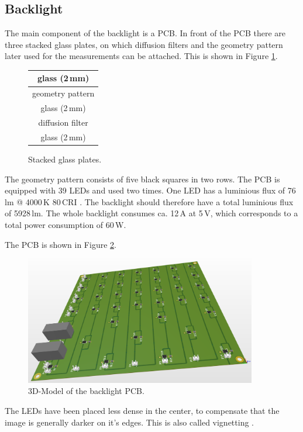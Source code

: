 \subsection{Backlight}
The main component of the backlight is a PCB.
In front of the PCB there are three stacked glass plates, on which diffusion filters and the geometry pattern later used for the measurements can be attached.
This is shown in Figure \ref{development:glass}.
\begin{figure}[ht]
	\centering
	\setlength{\tabcolsep}{12em}
	{\renewcommand{\arraystretch}{1}	
	\begin{tabular}{|c|}
		\hline
		\multicolumn{1}{|c|}{glass (2\,mm)}\\
		\hline
		\multicolumn{1}{|c|}{geometry pattern}\\
		\hline
		\multicolumn{1}{|c|}{glass (2\,mm)}\\
		\hline
		\multicolumn{1}{|c|}{diffusion filter}\\
		\hline
		\multicolumn{1}{|c|}{glass (2\,mm)}\\
		\hline
	\end{tabular}
	}
	\caption{Stacked glass plates.\label{development:glass}}
\end{figure}

The geometry pattern consists of five black squares in two rows.
The PCB is equipped with 39 LEDs and used two times.
One LED has a luminious flux of 76\,lm @ 4000\,K 80\,CRI \cite{led}.
The backlight should therefore have a total luminious flux of 5928\,lm.
The whole backlight consumes ca. 12\,A at 5\,V, which corresponds to a total power consumption of 60\,W. 

The PCB is shown in Figure \ref{development:pcb}.
\begin{figure}[ht]
	\centering
	\includegraphics[width=0.9\textwidth]{3-development/images/Backlight.png}
	\caption{3D-Model of the backlight PCB.\label{development:pcb}}
\end{figure} 
The LEDs have been placed less dense in the center, to compensate that the image is generally darker on it's edges.
This is also called vignetting \cite{vignetting}.

